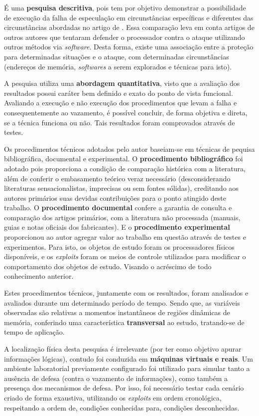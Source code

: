 \documentclass[
	article,			    %
	12pt,				    %
	oneside,			    %
	a4paper,			    %
	chapter=TITLE,		    %
	section=TITLE,		    %
	subsection=TITLE,	    %
	english,			    %
	brazil,				    %
	sumario=tradicional
]{abntex2}
\begin{document}
É uma \textbf{pesquisa descritiva}, pois tem por objetivo demonstrar a possibilidade de execução da falha de especulação em circunstâncias específicas e diferentes das circunstâncias abordadas no artigo de . Essa comparação leva em conta artigos de outros autores que tentaram defender o processador contra o ataque utilizando outros métodos via \emph{software}. Desta forma, existe uma associação entre a proteção para determinadas situações e o ataque, com determinadas circunstâncias (endereços de memória, \emph{softwares} a serem explorados e técnicas para isto).

A pesquisa utiliza uma \textbf{abordagem quantitativa}, visto que a avaliação dos resultados possui caráter bem definido e exato do ponto de vista funcional. Avaliando a execução e não execução dos procedimentos que levam a falha e consequentemente ao vazamento, é possível concluir, de forma objetiva e direta, se a técnica funciona ou não. Tais resultados foram comprovados através de testes.

Os procedimentos técnicos adotados pelo autor baseiam-se em técnicas de pequisa bibliográfica, documental e experimental. O \textbf{procedimento bibliográfico} foi adotado pois proporciona a condição de comparação histórica com a literatura, além de conferir o embasamento teórico veraz necessário (desconsiderando literaturas sensacionalistas, imprecisas ou sem fontes sólidas), creditando aos autores primários suas devidas contribuições para o ponto atingido deste trabalho. O \textbf{procedimento documental} confere a garantia de consulta e comparação dos artigos primários, com a literatura não processada (manuais, guias e notas oficiais dos fabricantes). E o \textbf{procedimento experimental} proporcionou ao autor agregar valor ao trabalho em questão através de testes e experimentos. Para isto, os objetos de estudo foram os processadores físicos disponíveis, e os \emph{exploits} foram os meios de controle utilizados para modificar o comportamento dos objetos de estudo. Visando o acréscimo de todo conhecimento anterior.

Estes procedimentos técnicos, juntamente com os resultados, foram analisados e avaliados durante um determinado período de tempo. Sendo que, as variáveis observadas são relativas a momentos instantâneos de regiões dinâmicas de memória, conferindo uma característica \textbf{transversal} ao estudo, tratando-se de tempo de aplicação.

A localização física desta pesquisa é irrelevante (por ter como objetivo apurar informações lógicas), contudo foi conduzida em \textbf{máquinas virtuais e reais}. Um ambiente laboratorial previamente configurado foi utilizado para simular tanto a ausência de defesa (contra o vazamento de informações), como também a presença dos mecanismos de defesa. Por isso, foi necessário testar cada cenário criado de forma exaustiva, utilizando os \emph{exploits} em ordem cronológica, respeitando a ordem de, condições conhecidas para, condições desconhecidas.
\end{document}

